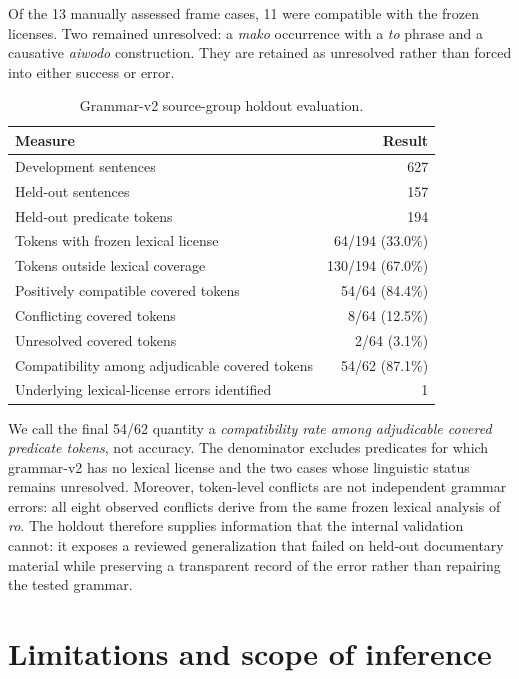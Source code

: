 \documentclass[11pt]{article}
\begin{document}
Of the 13 manually assessed frame cases, 11 were compatible with the frozen
licenses. Two remained unresolved: a \textit{mako} occurrence with a
\textit{to} phrase and a causative \textit{aiwodo} construction. They are
retained as unresolved rather than forced into either success or error.

\begin{table}[ht]
\centering
\caption{Grammar-v2 source-group holdout evaluation.}
\label{tab:v2holdout}
\begin{tabular}{lr}
\toprule
Measure & Result\\
\midrule
Development sentences & 627\\
Held-out sentences & 157\\
Held-out predicate tokens & 194\\
Tokens with frozen lexical license & 64/194 (33.0\%)\\
Tokens outside lexical coverage & 130/194 (67.0\%)\\
Positively compatible covered tokens & 54/64 (84.4\%)\\
Conflicting covered tokens & 8/64 (12.5\%)\\
Unresolved covered tokens & 2/64 (3.1\%)\\
Compatibility among adjudicable covered tokens & 54/62 (87.1\%)\\
Underlying lexical-license errors identified & 1\\
\bottomrule
\end{tabular}
\end{table}

We call the final 54/62 quantity a \emph{compatibility rate among adjudicable
covered predicate tokens}, not accuracy. The denominator excludes predicates
for which grammar-v2 has no lexical license and the two cases whose linguistic
status remains unresolved. Moreover, token-level conflicts are not independent
grammar errors: all eight observed conflicts derive from the same frozen
lexical analysis of \textit{ro}. The holdout therefore supplies information
that the internal validation cannot: it exposes a reviewed generalization that
failed on held-out documentary material while preserving a transparent record
of the error rather than repairing the tested grammar.

\section{Limitations and scope of inference}
\label{sec:limits}
\end{document}

